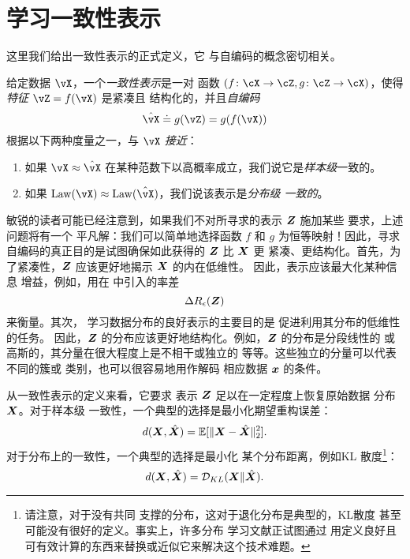 \documentclass[../../book-main.tex]{subfiles}
\begin{document}
\section{学习一致性表示}\label{sec:consistent-representation}

这里我们给出一致性表示的正式定义，它
与自编码的概念密切相关。%
\begin{definition}[一致性表示]\label{def:bidirectional_rep}
  给定数据 \(\vX\)，一个\textit{一致性表示}是一对
  函数 \((f \colon \cX \to \cZ, g \colon \cZ \to \cX)\)，使得
  \textit{特征} \(\vZ = f(\vX)\) 是紧凑且
  结构化的，并且\textit{自编码}
  \begin{equation}
    \hat{\vX} \doteq g(\vZ) = g(f(\vX))
  \end{equation}
  根据以下两种度量之一，与 \(\vX\) \textit{接近}：
  \begin{enumerate}
    \item 如果 \(\vX
      \approx \hat{\vX}\) 在某种范数下以高概率成立，我们说它是\textit{样本级}一致的。
    \item 如果 \(\Law(\vX) \approx \Law(\hat{\vX})\)，我们说该表示是\textit{分布级
      一致的}。
  \end{enumerate}
\end{definition}

敏锐的读者可能已经注意到，如果我们不对所寻求的表示 $\bm{Z}$ 施加某些
要求，上述问题将有一个
平凡解：我们可以简单地选择函数 $f$ 和 $g$
为恒等映射！因此，寻求
自编码的真正目的是试图确保如此获得的 $\bm{Z}$ 比 $\bm{X}$ 更
紧凑、更结构化。首先，为了紧凑性，$\bm{Z}$
应该更好地揭示 $\bm{X}$ 的内在低维性。
因此，表示应该最大化某种信息
增益，例如，用在  中引入的率差
\begin{equation}
  \Delta R_{\epsilon}(\bm{Z})
\end{equation}
来衡量。其次，
学习数据分布的良好表示的主要目的是
促进利用其分布的低维性的任务。
因此，$\bm{Z}$ 的分布应该更好地结构化。例如，$\bm{Z}$ 的分布是分段线性的
或高斯的，其分量在很大程度上是不相干或独立的
等等。这些独立的分量可以代表不同的簇或
类别，也可以很容易地用作解码
相应数据 $\bm{x}$ 的条件。

从一致性表示的定义来看，它要求
表示 $\bm{Z}$ 足以在一定程度上恢复原始数据
分布 $\bm{X}$。对于样本级
一致性，一个典型的选择是最小化期望重构误差：
\begin{equation}
  d(\bm{X}, \hat {\bm{X}}) = \mathbb{E}[\|\bm{X} - \hat{\bm{X}}\|_2^2].
\end{equation}
对于分布上的一致性，一个典型的选择是最小化
某个分布距离，例如KL
散度\footnote{请注意，对于没有共同
  支撑的分布，这对于退化分布是典型的，KL散度
  甚至可能没有很好的定义。事实上，许多分布
  学习文献正试图通过
  用定义良好且可有效计算的东西来替换或近似它来解决这个技术难题。}：
\begin{equation}
  d(\bm{X}, \hat {\bm{X}}) = \mathcal{D}_{KL}(\bm{X}\|\hat{\bm{X}}).
\end{equation}
\end{document}
